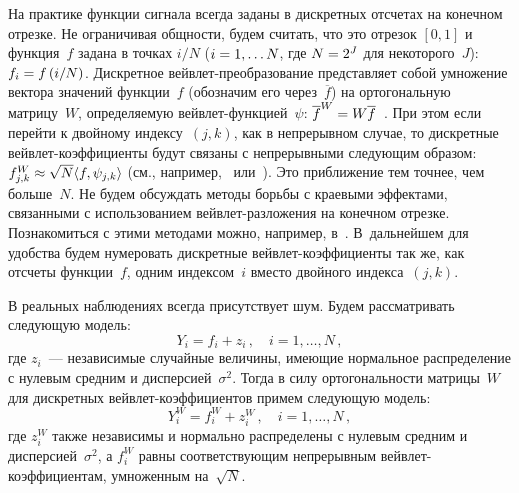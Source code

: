 \begin{multicols}{2}
На практике функции сигнала всегда заданы в дискретных отсчетах на конечном отрезке. 
Не ограничивая общности, будем считать, что это отрезок $[0,1]$ и функция~$f$ задана в точках ${i}/{N}$ ($i\hm=1,\ldots N$, где 
$N\hm=2^J$ для некоторого~$J$): $f_i\hm=f\left({i}/{N}\right)$.
Дискретное вейв\-лет-пре\-образо\-ва\-ние представляет собой умножение вектора значений функции~$f$ 
(обозначим его через~$\overline{f}$) на ортогональную матрицу~$W$, определяемую вейв\-лет-функ\-ци\-ей~$\psi$: 
$\overline{f}^{W}\hm=W\overline{f}$~\cite{14-she}. При этом если перейти к двойному индексу~$(j,k)$, 
как в непрерывном случае, то дискретные вейв\-лет-ко\-эф\-фи\-ци\-ен\-ты будут связаны с непрерывными 
следующим образом: $f^{W}_{j,k}\hm\approx \sqrt{N}\langle f,\psi_{j,k}\rangle$ (см., например,~\cite{1-she} или~\cite{15-she}). 
Это приближение тем точнее, чем больше~$N$. Не будем обсуждать методы борьбы с краевыми эффектами, связанными с 
использованием вейв\-лет-раз\-ло\-же\-ния на конечном отрезке. Познакомиться с этими методами можно, например, в~\cite{16-she}. 
В~дальнейшем для удобства будем нумеровать дискретные вейв\-лет-ко\-эф\-фи\-ци\-ен\-ты так же, как отсчеты функции~$f$, 
одним индексом~$i$ вместо двойного индекса~$(j,k)$.

В реальных наблюдениях всегда присутствует шум. Будем рассматривать следующую модель:
$$
Y_i=f_i+z_i\,,\quad i=1,\ldots,N\,,
$$
где $z_i$~--- независимые случайные величины, име\-ющие нормальное распределение с нулевым средним и дисперсией~$\sigma^2$. 
Тогда в силу ортогональности мат\-ри\-цы~$W$ для дискретных вейв\-лет-ко\-эф\-фи\-ци\-ен\-тов примем следующую модель:
$$
Y^W_i=f^{W}_{i}+z^W_i\,,\quad i=1,\ldots,N\,,
$$
где $z^W_i$ также независимы и нормально распределены с нулевым средним и дисперсией~$\sigma^2$, 
а $f^{W}_{i}$ равны соответствующим непрерывным вейв\-лет-ко\-эф\-фи\-ци\-ен\-там, умноженным на~$\sqrt{N}$.


\end{multicols}
